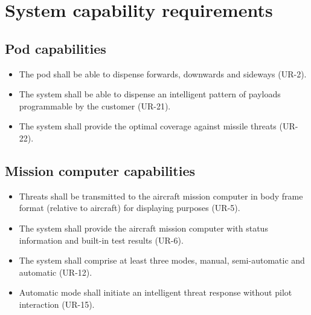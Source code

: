 \documentclass[Main]{subfiles}
\begin{document}
\section{System capability requirements}

\subsection{Pod capabilities}
\begin{itemize}
\item The pod shall be able to dispense forwards, downwards and sideways (UR-2).
\item The system shall be able to dispense an intelligent pattern of payloads programmable by the customer (UR-21).
\item The system shall provide the optimal coverage against missile threats (UR-22).

\end{itemize}

\subsection{Mission computer capabilities}

\begin{itemize}
\item Threats shall be transmitted to the aircraft mission computer in body frame format (relative to aircraft) for displaying purposes (UR-5).

\item The system shall provide the aircraft mission computer with status information and built-in test results (UR-6).

\item The system shall comprise at least three modes, manual, semi-automatic and automatic (UR-12).

\item Automatic mode shall initiate an intelligent threat response without pilot interaction (UR-15).

\end{itemize}
\end{document}
